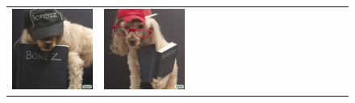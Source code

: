 \begin{figure}
\begin{adjustwidth}{-0.8in}{-0.5in}
\begin{tabular}{cccccccccccccccccccc}
\multicolumn{3}{c}{\includegraphics[width=\twobytwocolwidth\textwidth]{figures/limitations/poodle_board3.jpg}} &
\multicolumn{3}{c}{\includegraphics[width=\twobytwocolwidth\textwidth]{figures/limitations/poodle_board4.jpg}} &&

\end{tabular}
\end{adjustwidth}
\end{figure}
